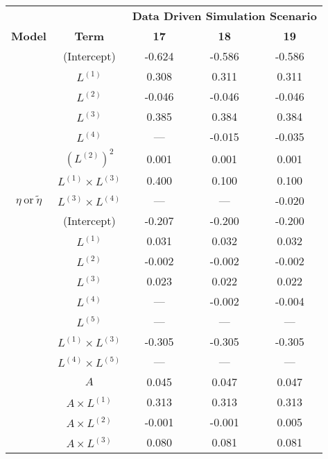 \begin{sidewaystable}
    \footnotesize
\begin{minipage}[t]{0.5\textwidth}
\centering

\begin{tabular}[t]{>{}cccc>{}c}
\hline
\multicolumn{1}{c}{\textbf{ }} & \multicolumn{1}{c}{\textbf{ }} & \multicolumn{3}{c}{\textbf{Data Driven Simulation Scenario}} \\
\cmidrule{3-5}
\textbf{Model} & \textbf{Term} & \textbf{17} & \textbf{18} & \textbf{19}\\
\hline
 & (Intercept) & -0.624 & -0.586 & -0.586\\
\cmidrule{2-5}
 & $L^{(1)}$ & 0.308 & 0.311 & 0.311\\
\cmidrule{2-5}
 & $L^{(2)}$ & -0.046 & -0.046 & -0.046\\
\cmidrule{2-5}
 & $L^{(3)}$ & 0.385 & 0.384 & 0.384\\
\cmidrule{2-5}
 & $L^{(4)}$ & --- & -0.015 & -0.035\\
\cmidrule{2-5}
 & $(L^{(2)})^2$ & 0.001 & 0.001 & 0.001\\
\cmidrule{2-5}
 & $L^{(1)} \times L^{(3)}$ & 0.400 & 0.100 & 0.100\\
\cmidrule{2-5}
\multirow{-8}{*}{\centering\arraybackslash $\eta~\text{or}~\tilde\eta$} & $L^{(3)} \times L^{(4)}$ & --- & --- & -0.020\\
\cmidrule{1-5}
 & (Intercept) & -0.207 & -0.200 & -0.200\\
\cmidrule{2-5}
 & $L^{(1)}$ & 0.031 & 0.032 & 0.032\\
\cmidrule{2-5}
 & $L^{(2)}$ & -0.002 & -0.002 & -0.002\\
\cmidrule{2-5}
 & $L^{(3)}$ & 0.023 & 0.022 & 0.022\\
\cmidrule{2-5}
 & $L^{(4)}$ & --- & -0.002 & -0.004\\
\cmidrule{2-5}
 & $L^{(5)}$ & --- & --- & ---\\
\cmidrule{2-5}
 & $L^{(1)} \times L^{(3)}$ & -0.305 & -0.305 & -0.305\\
\cmidrule{2-5}
 & $L^{(4)} \times L^{(5)}$ & --- & --- & ---\\
\cmidrule{2-5}
 & $A$ & 0.045 & 0.047 & 0.047\\
\cmidrule{2-5}
 & $A \times L^{(1)}$ & 0.313 & 0.313 & 0.313\\
\cmidrule{2-5}
 & $A \times L^{(2)}$ & -0.001 & -0.001 & 0.005\\
\cmidrule{2-5}
 & $A \times L^{(3)}$ & 0.080 & 0.081 & 0.081\\

\end{tabular}
\end{minipage}
\end{sidewaystable}
